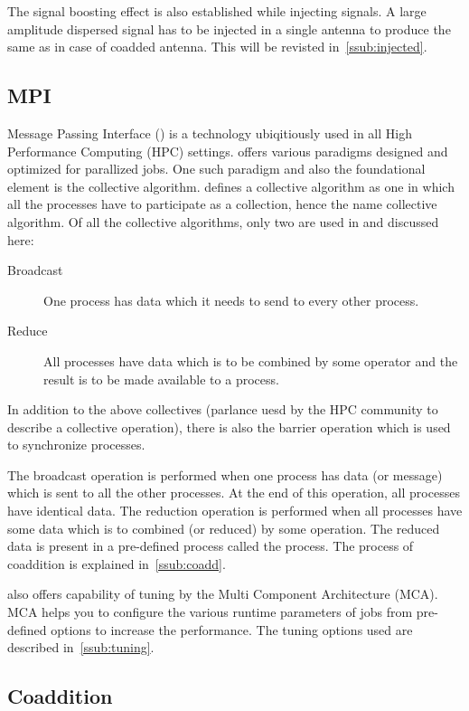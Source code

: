 \par The signal boosting effect is also established while injecting signals. 
A large amplitude dispersed signal has to be injected in a single antenna to produce the same \sn as in case of coadded antenna.
This will be revisted in~\autoref{ssub:injected}.

\subsection {MPI}
\par Message Passing Interface (\mpi) is a technology ubiqitiously used in all High Performance Computing (HPC) settings. 
\mpi offers various paradigms designed and optimized for parallized jobs. One such paradigm and also the foundational element is the collective algorithm. 
\mpi defines a collective algorithm as one in which all the processes have to participate as a collection, hence the name collective algorithm. Of all the collective algorithms, only two are used in \vf and discussed here:
\begin{description}
	\item[Broadcast] One process has data which it needs to send to every other process.
	\item[Reduce] All processes have data which is to be combined by some operator and the result is to be made available to a process.
\end{description}
In addition to the above collectives (parlance uesd by the HPC community to describe a collective operation), there is also the barrier operation which is used to synchronize processes. 

\par The broadcast operation is performed when one process has data (or message) which is sent to all the other processes. At the end of this operation, all processes have identical data. The reduction operation is performed when all processes have some data which is to combined (or reduced) by some operation. The reduced data is present in a pre-defined process called the \root process. 
The process of coaddition is explained in~\autoref{ssub:coadd}. 

\par \mpi also offers capability of tuning by the Multi Component Architecture (MCA). MCA helps you to configure the various runtime parameters of \mpi jobs from pre-defined options to increase the performance. The tuning options used are described in~\autoref{ssub:tuning}.

\subsection {Coaddition}
\label{ssub:coadd}

